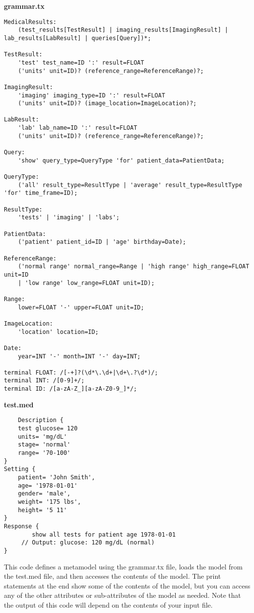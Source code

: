 \textbf{grammar.tx}
\begin{lstlisting}
MedicalResults:
    (test_results[TestResult] | imaging_results[ImagingResult] | lab_results[LabResult] | queries[Query])*;

TestResult:
    'test' test_name=ID ':' result=FLOAT 
    ('units' unit=ID)? (reference_range=ReferenceRange)?;

ImagingResult:
    'imaging' imaging_type=ID ':' result=FLOAT 
    ('units' unit=ID)? (image_location=ImageLocation)?;

LabResult:
    'lab' lab_name=ID ':' result=FLOAT 
    ('units' unit=ID)? (reference_range=ReferenceRange)?;

Query:
    'show' query_type=QueryType 'for' patient_data=PatientData;

QueryType:
    ('all' result_type=ResultType | 'average' result_type=ResultType 'for' time_frame=ID);

ResultType:
    'tests' | 'imaging' | 'labs';

PatientData:
    ('patient' patient_id=ID | 'age' birthday=Date);

ReferenceRange:
    ('normal range' normal_range=Range | 'high range' high_range=FLOAT unit=ID 
    | 'low range' low_range=FLOAT unit=ID);

Range:
    lower=FLOAT '-' upper=FLOAT unit=ID;

ImageLocation:
    'location' location=ID;

Date:
    year=INT '-' month=INT '-' day=INT;

terminal FLOAT: /[-+]?(\d*\.\d+|\d+\.?\d*)/;
terminal INT: /[0-9]+/;
terminal ID: /[a-zA-Z_][a-zA-Z0-9_]*/;
\end{lstlisting}

\textbf{test.med}
\begin{lstlisting}
    Description { 
	test glucose= 120 
	units= 'mg/dL' 
	stage= 'normal' 
	range= '70-100'
}
Setting {
	patient= 'John Smith', 
	age= '1978-01-01'
	gender= 'male',
	weight= '175 lbs',
	height= '5 11'
}
Response {
    	show all tests for patient age 1978-01-01
   	 // Output: glucose: 120 mg/dL (normal)
}
\end{lstlisting}

This code defines a metamodel using the grammar.tx file, loads the model from the test.med file, and then accesses the contents of the model. The print statements at the end show some of the contents of the model, but you can access any of the other attributes or sub-attributes of the model as needed. Note that the output of this code will depend on the contents of your input file.

